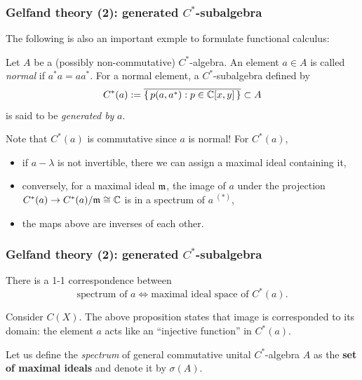 \documentclass[10pt]{beamer}
\begin{document}
\begin{frame}
\frametitle{Gelfand theory (2): generated $C^*$-subalgebra}
  The following is also an important exmple to formulate functional calculus:
  \begin{defn}
    Let $A$ be a (possibly non-commutative) $C^*$-algebra.
    An element $a\in A$ is called \emph{normal} if $a^*a=aa^*$.
    For a normal element, a $C^*$-subalgebra defined by
    \[C^*(a):=\overline{\{\,p(a,a^*):p\in\mathbb{C}[x,y]\,\}}\subset A\]
    is said to be \emph{generated by} $a$.
  \end{defn}
  \pause Note that $C^*(a)$ is commutative since $a$ is normal! For $C^*(a)$,
  \pause
  \begin{itemize}[<+->]
    \item if $a-\lambda$ is not invertible, there we can assign a maximal ideal containing it,
    \item conversely, for a maximal ideal $\mathfrak{m}$, the image of $a$ under the projection $C^*(a)\to C^*(a)/\fm\cong\C$ is in a spectrum of $a\ ^{(*)}$,
    \item the maps above are inverses of each other.
  \end{itemize}
\end{frame}

\begin{frame}
\frametitle{Gelfand theory (2): generated $C^*$-subalgebra}
  \begin{prop}
    There is a 1-1 correspondence between
    \[\text{spectrum of $a$}\iff\text{maximal ideal space of $C^*(a)$}.\]
  \end{prop}
  \pause
  Consider $C(X)$.
  The above proposition states that image is corresponded to its domain: the element $a$ acts like an ``injective function'' in $C^*(a)$.
  \pause
  \begin{defn}
    Let us define the \emph{spectrum} of general commutative unital $C^*$-algebra $A$ as the \textbf{set of maximal ideals} and denote it by $\sigma(A)$.
  \end{defn}
\end{frame}
\end{document}
